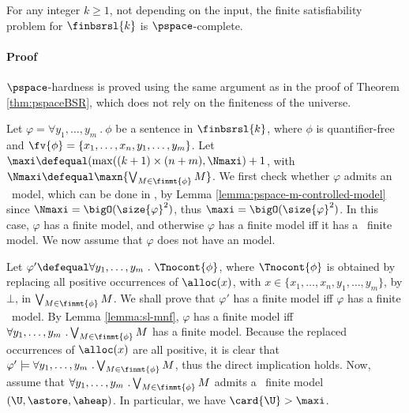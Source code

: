 \begin{theorem}\label{thm:pspaceBSRfin}
For any integer $k\geq1$, not depending on the input, the finite
satisfiability problem for $\finbsrsl{k}$ is $\pspace$-complete.
\end{theorem}
\paragraph{Proof} 
$\pspace$-hardness is proved using the same argument as in the proof
of Theorem \ref{thm:pspaceBSR}, which does not rely on the finiteness
of the universe.

Let $\varphi = \forall y_1,\dots,y_m~.~ \phi$ be a sentence in
$\finbsrsl{k}$, where $\phi$ is quantifier-free and $\fv{\phi} =
\{x_1,\ldots,x_n,y_1,\ldots,y_m\}$. Let $\maxi
\defequal(\max((k+1)\times(n+m),\Nmaxi)+1$, with $\Nmaxi \defequal
\maxn{\bigvee_{M \in \finmt{\phi}} M}$. We first check whether
$\varphi$ admits an \controlled\ model, which can be done in \pspace,
by Lemma \ref{lemma:pspace-m-controlled-model} since $\Nmaxi =
\bigO(\size{\varphi}^2)$, thus $\maxi=\bigO(\size{\varphi}^2)$. In
this case, $\varphi$ has a finite model, and otherwise $\varphi$ has a
finite model iff it has a \ncontrolled\ finite model. We now assume
that $\varphi$ does not have an {\controlled} model.

Let $\varphi' \defequal \forall y_1,\dots,y_m~.~ \Tnocont{\phi}$,
where $\Tnocont{\phi}$ is obtained by replacing all positive
occurrences of $\alloc(x)$, with $x \in \{x_1, \ldots, x_n,
y_1,\ldots, y_m\}$, by $\bot$, in $\bigvee_{M \in \finmt{\phi}} M$. We
shall prove that $\varphi'$ has a finite model iff $\varphi$ has a
finite \ncontrolled\ model. By Lemma \ref{lemma:sl-mnf}, $\varphi$ has
a finite model iff $\forall y_1,\dots,y_m~. \bigvee_{M \in
  \finmt{\phi}} M$ has a finite model. Because the replaced
occurrences of $\alloc(x)$ are all positive, it is clear that
$\varphi' \models \forall y_1,\dots,y_m~. \bigvee_{M \in \finmt{\phi}}
M$, thus the direct implication holds. Now, assume that $\forall
y_1,\dots,y_m~. \bigvee_{M \in \finmt{\phi}} M$ admits a
\ncontrolled\ finite model $(\U,\astore,\aheap)$. In particular, we
have $\card{\U} > \maxi$.

